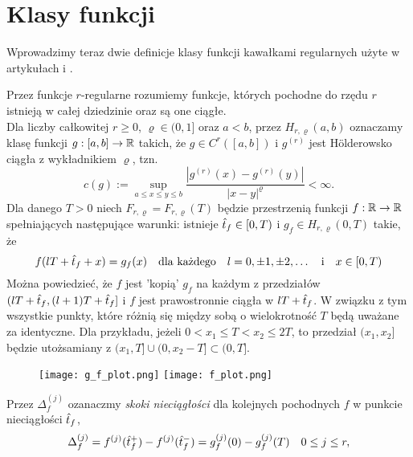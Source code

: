 \documentclass[oik, pdftex, robocza, man]{mgrwms}
\begin{document}
\section{Klasy funkcji} \label{rozdzial:klasy_funkcji}

    Wprowadzimy teraz dwie definicje klasy funkcji kawałkami regularnych użyte w artykułach \cite{CoDF} i \cite{AoP}. 

    Przez funkcje $r$-regularne rozumiemy funkcje, których pochodne do rzędu $r$ istnieją w całej dziedzinie oraz są one ciągłe. \\
    Dla liczby całkowitej $ r \geq 0$, $\varrho \in (0,1]$ oraz $a < b$, przez $H_{r, \varrho}(a,b)$ oznaczamy klasę funkcji $g: [a,b] \rightarrow \mathbb{R}$ takich, że $g \in C^r([a, b])$ i $g^{(r)}$ jest Hölderowsko ciągła z wykładnikiem $\varrho$, tzn.
    \begin{equation*}
        c(g) := \sup_{a \leq x \leq y \leq b} \frac{|g^{(r)}(x) - g^{(r)}(y)|}{|x-y|^{\varrho}} < \infty.
    \end{equation*}
    Dla danego $T > 0$ niech $F_{r, \varrho} = F_{r, \varrho}(T)$ będzie przestrzenią funkcji $f: \mathbb{R} \rightarrow \mathbb{R}$ spełniających następujące warunki: istnieje $\hat{t}_{f} \in [0, T)$ i $g_f \in H_{r, \varrho}(0,T)$ takie, że
    \begin{equation*}
        f(lT + \hat{t}_f + x) = g_f(x) \quad \text{dla każdego} \quad l = 0, \pm 1, \pm 2, \ldots \quad \text{i} \quad x \in [0, T)
    \end{equation*}
    Można powiedzieć, że $f$ jest 'kopią' $g_f$ na każdym z przedziałów $(lT + \hat{t}_f, (l + 1)T + \hat{t}_f]$ i $f$ jest prawostronnie ciągła w $lT + \hat{t}_f$. W związku z tym wszystkie punkty, które różnią się między sobą o wielokrotność $T$ będą uważane za identyczne. Dla przykładu, jeżeli $0 < x_1 \leq T < x_2 \leq 2T$, to przedział $(x_1, x_2]$ będzie utożsamiany z $(x_1,T] \cup (0, x_2 - T] \subset (0, T]$.

    \begin{figure}[h!]
        \texttt{[image: g\_f\_plot.png]}
        \texttt{[image: f\_plot.png]}
    \end{figure}


    Przez $\Delta_f^{(j)}$ ozanaczmy \emph{skoki nieciągłości} dla kolejnych pochodnych $f$ w punkcie nieciągłości $\hat{t}_f$,
    \begin{equation*}
        \Delta_f^{(j)} = f^{(j)}(\hat{t}_f^+) - f^{(j)}(\hat{t}_f^-) = g_f^{(j)}(0) - g_f^{(j)}(T) \quad 0 \leq j \leq r,
    \end{equation*}
\end{document}
